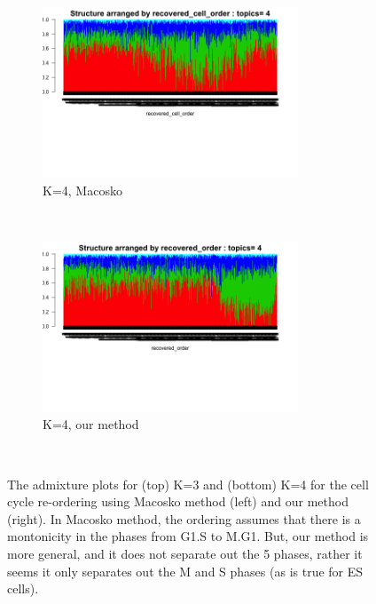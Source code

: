 \documentclass[11pt]{article}
\begin{document}
\begin{figure}[ht]
     \begin{subfigure}[t]{0.5\textwidth}
        \centering
        \includegraphics[height=2in]{../figures/ipsc_structure_batchcorrect_cellcycle/clus_4/struct_clus_4_recovered_cell_order.png}
        \caption{K=4, Macosko}
    \end{subfigure}%
    ~
    \begin{subfigure}[t]{0.5\textwidth}
        \centering
        \includegraphics[height=2in]{../figures/ipsc_structure_batchcorrect_cellcycle/clus_4/struct_clus_4_recovered_order.png}
        \caption{K=4, our method}
    \end{subfigure}\\
  \caption{The admixture plots for (top) K=3 and (bottom) K=4 for the cell cycle re-ordering using Macosko method (left) and our method (right). In Macosko method, the ordering assumes that there is a montonicity in the phases from G1.S to M.G1. But, our method is more general, and it does not separate out the 5 phases, rather it seems it only separates out the M and S phases (as is true for ES cells).}
 \label{fig:fig5}
 \end{figure}   
 
\end{document}
